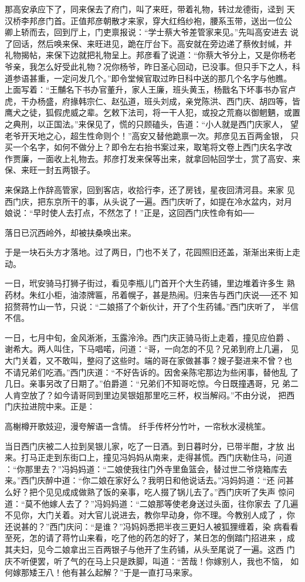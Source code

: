 那高安承应下了，同来保去了府门，叫了来旺，带着礼物，转过龙德街，迳到
天汉桥李邦彦门首。正值邦彦朝散才来家，穿大红绉纱袍，腰系玉带，送出一位公
卿上轿而去，回到厅上，门吏禀报说：“学士蔡大爷差管家来见。”先叫高安进去
说了回话，然后唤来保、来旺进见，跪在厅台下。高安就在旁边递了蔡攸封缄，并
礼物揭帖，来保下边就把礼物呈上。邦彦看了说道：“你蔡大爷分上，又是你杨老
爷亲，我怎么好受此礼物？况你杨爷，昨日圣心回动，已没事。但只手下之人，科
道参语甚重，一定问发几个。”即令堂候官取过昨日科中送的那几个名字与他瞧。
上面写着：“王黼名下书办官董升，家人王廉，班头黄玉，杨戬名下坏事书办官卢
虎，干办杨盛，府掾韩宗仁、赵弘道，班头刘成，亲党陈洪、西门庆、胡四等，皆
鹰犬之徒，狐假虎威之辈。乞敕下法司，将一干人犯，或投之荒裔以御魍魉，或置
之典刑，以正国法。”来保见了，慌的只顾磕头，告道：“小人就是西门庆家人，
望老爷开天地之心，超生性命则个！”高安又替他跪禀一次。邦彦见五百两金银，
只买一个名字，如何不做分上？即令左右抬书案过来，取笔将文卷上西门庆名字改
作贾廉，一面收上礼物去。邦彦打发来保等出来，就拿回帖回学士，赏了高安、来
保、来旺一封五两银子。

来保路上作辞高管家，回到客店，收拾行李，还了房钱，星夜回清河县。来家
见西门庆，把东京所干的事，从头说了一遍。西门庆听了，如提在冷水盆内，对月
娘说：“早时使人去打点，不然怎了！”正是，这回西门庆性命有如──

落日已沉西岭外，却被扶桑唤出来。

于是一块石头方才落地。过了两日，门也不关了，花园照旧还盖，渐渐出来街上走
动。

一日，玳安骑马打狮子街过，看见李瓶儿门首开个大生药铺，里边堆着许多生
熟药材。朱红小柜，油漆牌匾，吊着幌子，甚是热闹。归来告与西门庆说──还不
知招赘蒋竹山一节，只说：“二娘搭了个新伙计，开了个生药铺。”西门庆听了，
半信不信。

一日，七月中旬，金风淅淅，玉露泠泠。西门庆正骑马街上走着，撞见应伯爵
、谢希大。两人叫住，下马唱喏，问道：“哥，一向怎的不见？兄弟到府上几遍，
见大门关着，又不敢叫，整闷了这些时。端的哥在家做甚事？嫂子娶进来不曾？也
不请兄弟们吃酒。”西门庆道：“不好告诉的。因舍亲陈宅那边为些闲事，替他乱
了几日。亲事另改了日期了。”伯爵道：“兄弟们不知哥吃惊。今日既撞遇哥，兄
弟二人肯空放了？如今请哥同到里边吴银姐那里吃三杯，权当解闷。”不由分说，
把西门庆拉进院中来。正是：

高榭樽开歌妓迎，漫夸解语一含情。
纤手传杯分竹叶，一帘秋水浸桃笙。

当日西门庆被二人拉到吴银儿家，吃了一日酒。到日暮时分，已带半酣，才放
出来。打马正走到东街口上，撞见冯妈妈从南来，走得甚慌。西门庆勒住马，问道
：“你那里去？”冯妈妈道：“二娘使我往门外寺里鱼篮会，替过世二爷烧箱库去
来。”西门庆醉中道：“你二娘在家好么？我明日和他说话去。”冯妈妈道：“还
问甚么好？把个见见成成做熟了饭的亲事，吃人掇了锅儿去了。”西门庆听了失声
惊问道：“莫不他嫁人去了？”冯妈妈道：“二娘那等使老身送过头面，往你家去
了几遍不见你，大门关着。对大官儿说进去，教你早动身，你不理。今教别人成了
，你还说甚的？”西门庆问：“是谁？”冯妈妈悉把半夜三更妇人被狐狸缠着，染
病看看至死，怎的请了蒋竹山来看，吃了他的药怎的好了，某日怎的倒踏门招进来
，成其夫妇，见今二娘拿出三百两银子与他开了生药铺，从头至尾说了一遍。这西
门庆不听便罢，听了气的在马上只是跌脚，叫道：“苦哉！你嫁别人，我也不恼，
如何嫁那矮王八！他有甚么起解？”于是一直打马来家。

